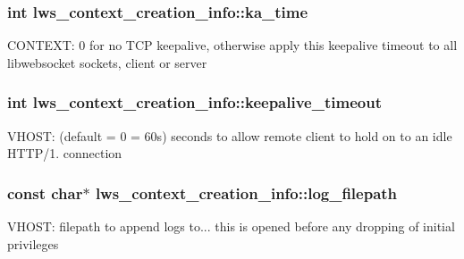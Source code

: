 \subsubsection[{\texorpdfstring{ka\+\_\+time}{ka\_time}}]{\setlength{\rightskip}{0pt plus 5cm}int lws\+\_\+context\+\_\+creation\+\_\+info\+::ka\+\_\+time}\hypertarget{structlws__context__creation__info_ac583ce92b8e1c949cb6fef6bfe713d56}{}\label{structlws__context__creation__info_ac583ce92b8e1c949cb6fef6bfe713d56}
C\+O\+N\+T\+E\+XT\+: 0 for no T\+CP keepalive, otherwise apply this keepalive timeout to all libwebsocket sockets, client or server 
\subsubsection[{\texorpdfstring{keepalive\+\_\+timeout}{keepalive\_timeout}}]{\setlength{\rightskip}{0pt plus 5cm}int lws\+\_\+context\+\_\+creation\+\_\+info\+::keepalive\+\_\+timeout}\hypertarget{structlws__context__creation__info_a81697c6b763b5ef3ee52862bc70b07d6}{}\label{structlws__context__creation__info_a81697c6b763b5ef3ee52862bc70b07d6}
V\+H\+O\+ST\+: (default = 0 = 60s) seconds to allow remote client to hold on to an idle H\+T\+T\+P/1. connection 
\subsubsection[{\texorpdfstring{log\+\_\+filepath}{log\_filepath}}]{\setlength{\rightskip}{0pt plus 5cm}const char$\ast$ lws\+\_\+context\+\_\+creation\+\_\+info\+::log\+\_\+filepath}\hypertarget{structlws__context__creation__info_ad0e95ba721f7bd2b676719f8093c23a2}{}\label{structlws__context__creation__info_ad0e95ba721f7bd2b676719f8093c23a2}
V\+H\+O\+ST\+: filepath to append logs to... this is opened before any dropping of initial privileges 
